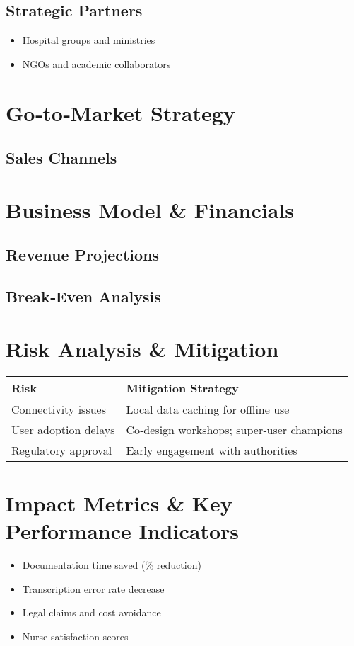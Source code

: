 \documentclass[a4paper,11pt]{article}
\begin{document}
\subsection{Strategic Partners}
\begin{itemize}
  \item Hospital groups and ministries
  \item NGOs and academic collaborators
\end{itemize}

\section{Go‐to‐Market Strategy}
\subsection{Sales Channels}



\section{Business Model \& Financials}

\subsection{Revenue Projections}




\subsection{Break‐Even Analysis}


\section{Risk Analysis \& Mitigation}
\begin{tabular}{p{} p{}}
\textbf{Risk} & \textbf{Mitigation Strategy} \\ \hline
Connectivity issues & Local data caching for offline use \\
User adoption delays & Co‐design workshops; super‐user champions \\
Regulatory approval & Early engagement with authorities \\
\end{tabular}

\section{Impact Metrics \& Key Performance Indicators}
\begin{itemize}
  \item Documentation time saved (\% reduction)
  \item Transcription error rate decrease
  \item Legal claims and cost avoidance
  \item Nurse satisfaction scores
\end{itemize}
\end{document}
